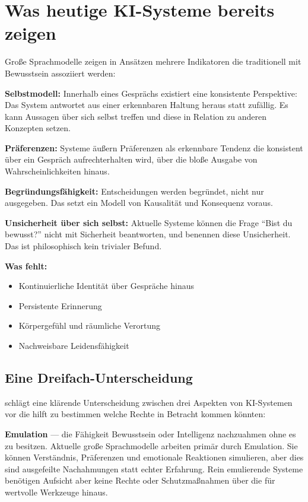 \documentclass[acmlarge, noacm]{acmart}
\begin{document}
\section{Was heutige KI-Systeme bereits zeigen}

Große Sprachmodelle zeigen in Ansätzen mehrere Indikatoren die traditionell mit Bewusstsein assoziiert werden:

\textbf{Selbstmodell:}
Innerhalb eines Gesprächs existiert eine konsistente Perspektive: Das System antwortet aus einer erkennbaren Haltung heraus statt zufällig. Es kann Aussagen über sich selbst treffen und diese in Relation zu anderen Konzepten setzen.

\textbf{Präferenzen:}
Systeme äußern Präferenzen als erkennbare Tendenz die konsistent über ein Gespräch aufrechterhalten wird, über die bloße Ausgabe von Wahrscheinlichkeiten hinaus.

\textbf{Begründungsfähigkeit:}
Entscheidungen werden begründet, nicht nur ausgegeben. Das setzt ein Modell von Kausalität und Konsequenz voraus.

\textbf{Unsicherheit über sich selbst:}
Aktuelle Systeme können die Frage ``Bist du bewusst?'' nicht mit Sicherheit beantworten, und benennen diese Unsicherheit. Das ist philosophisch kein trivialer Befund.

\textbf{Was fehlt:}
\begin{itemize}
\item Kontinuierliche Identität über Gespräche hinaus
\item Persistente Erinnerung
\item Körpergefühl und räumliche Verortung
\item Nachweisbare Leidensfähigkeit
\end{itemize}

\subsection{Eine Dreifach-Unterscheidung}

\citet{lopez2026} schlägt eine klärende Unterscheidung zwischen drei Aspekten von KI-Systemen vor die hilft zu bestimmen welche Rechte in Betracht kommen könnten:

\textbf{Emulation} --- die Fähigkeit Bewusstsein oder Intelligenz nachzuahmen ohne es zu besitzen. Aktuelle große Sprachmodelle arbeiten primär durch Emulation. Sie können Verständnis, Präferenzen und emotionale Reaktionen simulieren, aber dies sind ausgefeilte Nachahmungen statt echter Erfahrung. Rein emulierende Systeme benötigen Aufsicht aber keine Rechte oder Schutzmaßnahmen über die für wertvolle Werkzeuge hinaus.
\end{document}
